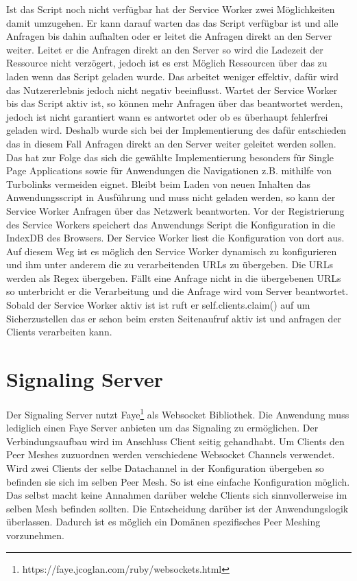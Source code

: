 \begin{description}
Ist das Script noch nicht verfügbar hat der Service Worker zwei Möglichkeiten damit umzugehen. Er kann darauf warten das das Script verfügbar ist und alle Anfragen bis dahin aufhalten oder er leitet die Anfragen direkt an den Server weiter. Leitet er die Anfragen direkt an den Server so wird die Ladezeit der Ressource nicht verzögert, jedoch ist es erst Möglich Ressourcen über das \pTp \cdn zu laden wenn das Script geladen wurde. Das \cdn arbeitet weniger effektiv, dafür wird das Nutzererlebnis jedoch nicht negativ beeinflusst. Wartet der Service Worker bis das Script aktiv ist, so können mehr Anfragen über das \cdn beantwortet werden, jedoch ist nicht garantiert wann es antwortet oder ob es überhaupt fehlerfrei geladen wird. Deshalb wurde sich bei der Implementierung des \cdns dafür entschieden das in diesem Fall Anfragen direkt an den Server weiter geleitet werden sollen. Das hat zur Folge das sich die gewählte Implementierung besonders für Single Page Applications sowie für Anwendungen die Navigationen z.B. mithilfe von Turbolinks vermeiden eignet. Bleibt beim Laden von neuen Inhalten das Anwendungsscript in Ausführung und muss nicht geladen werden, so kann der Service Worker Anfragen über das \pTp Netzwerk beantworten.
 Vor der Registrierung des Service Workers speichert das Anwendungs Script die Konfiguration in die IndexDB des Browsers. Der Service Worker liest die Konfiguration von dort aus. Auf diesem Weg ist es möglich den Service Worker dynamisch zu konfigurieren und ihm unter anderem die zu verarbeitenden URLs zu übergeben. Die URLs werden als Regex übergeben. Fällt eine Anfrage nicht in die übergebenen URLs so unterbricht er die Verarbeitung und die Anfrage wird vom Server beantwortet.
 Sobald der Service Worker aktiv ist ist ruft er self.clients.claim() auf um Sicherzustellen das er schon beim ersten Seitenaufruf aktiv ist und anfragen der Clients verarbeiten kann.
 
\section{Signaling Server}
Der Signaling Server nutzt Faye\footnote{https://faye.jcoglan.com/ruby/websockets.html} als Websocket Bibliothek. Die Anwendung muss lediglich einen Faye Server anbieten um das Signaling zu ermöglichen. Der Verbindungsaufbau wird im Anschluss Client seitig gehandhabt. 
Um Clients den Peer Meshes zuzuordnen werden verschiedene Websocket Channels verwendet. Wird zwei Clients der selbe Datachannel in der Konfiguration übergeben so befinden sie sich im selben Peer Mesh. So ist eine einfache Konfiguration möglich. Das \cdn selbst macht keine Annahmen darüber welche Clients sich sinnvollerweise im selben Mesh befinden sollten. Die Entscheidung darüber ist der Anwendungslogik überlassen. Dadurch ist es möglich ein Domänen spezifisches Peer Meshing vorzunehmen.


\end{description}
